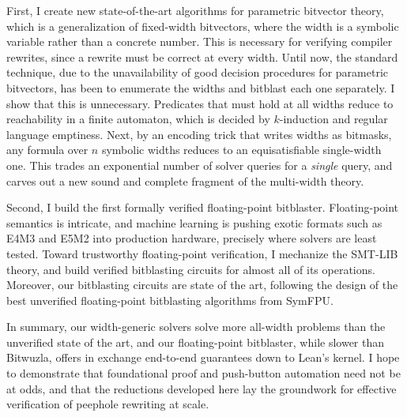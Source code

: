 First, I create new state-of-the-art algorithms for parametric bitvector theory,
which is a generalization of fixed-width bitvectors, where the width is a symbolic variable rather than a concrete number.
This is necessary for verifying compiler rewrites, since a rewrite must be correct at every width.
Until now, the standard technique, due to the unavailability of good decision procedures for parametric bitvectors,
has been to enumerate the widths and bitblast each one separately.
I show that this is unnecessary. Predicates that must hold at all widths reduce to reachability in a finite automaton,
which is decided by $k$-induction and regular language emptiness.
Next, by an encoding trick that writes widths as bitmasks,
any formula over $n$ symbolic widths reduces to an equisatisfiable single-width one.
This trades an exponential number of solver queries for a \emph{single} query,
and carves out a new sound and complete fragment of the multi-width theory.

Second, I build the first formally verified floating-point bitblaster.
Floating-point semantics is intricate, and machine learning is pushing exotic formats such as E4M3 and E5M2 into production hardware,
precisely where solvers are least tested.
Toward trustworthy floating-point verification, I mechanize the SMT-LIB \qffp{} theory,
and build verified bitblasting circuits for almost all of its operations.
Moreover, our bitblasting circuits are state of the art,
following the design of the best unverified floating-point bitblasting algorithms from SymFPU.

In summary, our width-generic solvers solve more all-width problems than the unverified state of the art,
and our floating-point bitblaster, while slower than Bitwuzla,
offers in exchange end-to-end guarantees down to Lean's kernel.
I hope to demonstrate that foundational proof and push-button automation need not be at odds,
and that the reductions developed here lay the groundwork for effective verification of peephole rewriting at scale.
